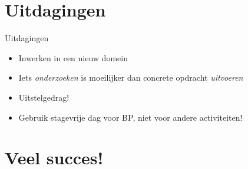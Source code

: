 \documentclass[usenames,dvipsnames]{beamer}
\begin{document}
\section{Uitdagingen}
\sectionframe{}

\begin{frame}{Uitdagingen}

\begin{itemize}
  \item Inwerken in een nieuw domein
  \item Iets \emph{onderzoeken} is moeilijker dan concrete opdracht \emph{uitvoeren}
  \item Uitstelgedrag!
  \item Gebruik stagevrije dag voor BP, niet voor andere activiteiten!
\end{itemize}

\end{frame}



\section{Veel succes!}
\sectionframe{}
\end{document}
